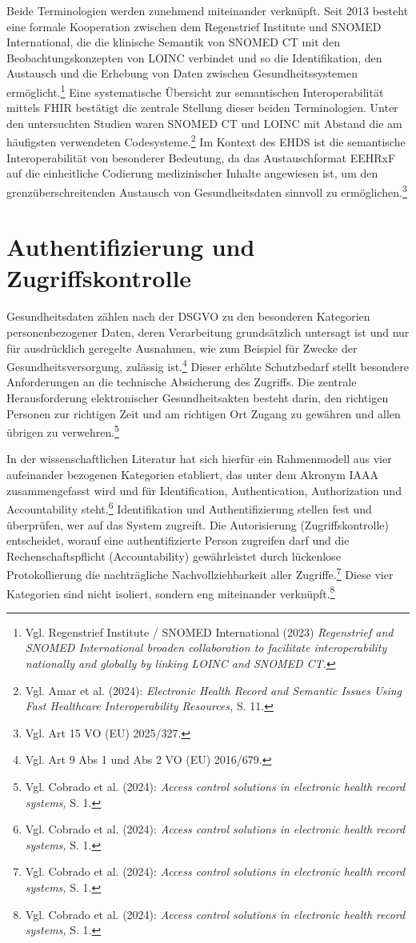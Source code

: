 Beide Terminologien werden zunehmend miteinander verknüpft. Seit 2013 besteht eine formale Kooperation zwischen dem Regenstrief Institute und SNOMED International, die die klinische Semantik von SNOMED CT mit den Beobachtungskonzepten von LOINC verbindet und so die Identifikation, den Austausch und die Erhebung von Daten zwischen Gesundheitssystemen ermöglicht.\footnote{Vgl. Regenstrief Institute / SNOMED International (2023) \textit{Regenstrief and SNOMED International broaden collaboration to facilitate interoperability nationally and globally by linking LOINC and SNOMED CT.}} Eine systematische Übersicht zur semantischen Interoperabilität mittels FHIR bestätigt die zentrale Stellung dieser beiden Terminologien. Unter den untersuchten Studien waren SNOMED CT und LOINC mit Abstand die am häufigsten verwendeten Codesysteme.\footnote{Vgl. Amar et al. (2024):  \textit{Electronic Health Record and Semantic Issues Using Fast Healthcare Interoperability Resources,} S. 11.} Im Kontext des EHDS ist die semantische Interoperabilität von besonderer Bedeutung, da das Austauschformat EEHRxF auf die einheitliche Codierung medizinischer Inhalte angewiesen ist, um den grenzüberschreitenden Austausch von Gesundheitsdaten sinnvoll zu ermöglichen.\footnote{Vgl. Art 15 VO (EU) 2025/327.}

\section{Authentifizierung und Zugriffskontrolle}
Gesundheitsdaten zählen nach der DSGVO zu den besonderen Kategorien personenbezogener Daten, deren Verarbeitung grundsätzlich untersagt ist und nur für ausdrücklich geregelte Ausnahmen, wie zum Beispiel für Zwecke der Gesundheitsversorgung, zulässig ist.\footnote{Vgl. Art 9 Abs 1 und Abs 2 VO (EU) 2016/679.} Dieser erhöhte Schutzbedarf stellt besondere Anforderungen an die technische Absicherung des Zugriffs. Die zentrale Herausforderung elektronischer Gesundheitsakten besteht darin, den richtigen Personen zur richtigen Zeit und am richtigen Ort Zugang zu gewähren und allen übrigen zu verwehren.\footnote{Vgl. Cobrado et al. (2024):  \textit{Access control solutions in electronic health record systems,} S. 1.}

In der wissenschaftlichen Literatur hat sich hierfür ein Rahmenmodell aus vier aufeinander bezogenen Kategorien etabliert, das unter dem Akronym IAAA zusammengefasst wird und für Identification, Authentication, Authorization und Accountability steht.\footnote{Vgl. Cobrado et al. (2024):  \textit{Access control solutions in electronic health record systems,} S. 1.} Identifikation und Authentifizierung stellen fest und überprüfen, wer auf das System zugreift. Die Autorisierung (Zugriffskontrolle) entscheidet, worauf eine authentifizierte Person zugreifen darf und die Rechenschaftspflicht (Accountability) gewährleistet durch lückenlose Protokollierung die nachträgliche Nachvollziehbarkeit aller Zugriffe.\footnote{Vgl. Cobrado et al. (2024):  \textit{Access control solutions in electronic health record systems,} S. 1.} Diese vier Kategorien sind nicht isoliert, sondern eng miteinander verknüpft.\footnote{Vgl. Cobrado et al. (2024):  \textit{Access control solutions in electronic health record systems,} S. 1.}

